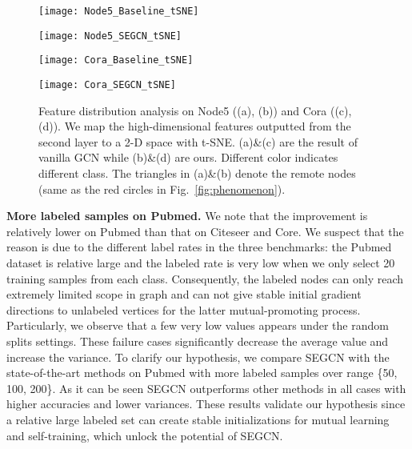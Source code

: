 \documentclass[letterpaper]{article} \usepackage{aaai19}  \usepackage{times}  \usepackage{helvet}  \usepackage{courier}  \usepackage{url}  \usepackage{graphicx}  \usepackage{algorithm}
\begin{document}
\begin{figure*} 

\begin{minipage}[b]{.24\textwidth}
\texttt{[image: Node5\_Baseline\_tSNE]}
\subcaption{}
\end{minipage}
\begin{minipage}[b]{.24\linewidth}
\texttt{[image: Node5\_SEGCN\_tSNE]}
\subcaption{}
\end{minipage}
\begin{minipage}[b]{.24\linewidth}
\texttt{[image: Cora\_Baseline\_tSNE]}
\subcaption{}
\end{minipage}
\begin{minipage}[b]{.24\linewidth}
\texttt{[image: Cora\_SEGCN\_tSNE]}
\subcaption{}
\end{minipage}
\caption{Feature distribution analysis on Node5 ((a), (b)) and Cora ((c), (d)). We map the high-dimensional features outputted from the second layer to a 2-D space with t-SNE. (a)\&(c) are the result of vanilla GCN while (b)\&(d) are ours. Different color indicates different class. The triangles in (a)\&(b) denote the remote nodes (same as the red circles in Fig.~\ref{fig:phenomenon}).}
\label{fig:tSNE}
\end{figure*} 
\textbf{More labeled samples on Pubmed.} We note that the improvement is relatively lower on Pubmed than that on Citeseer and Core. We suspect that the reason is due to the different label rates in the three benchmarks: the Pubmed dataset is relative large and the labeled rate is very low when we only select 20 training samples from each class. Consequently, the labeled nodes can only reach extremely limited scope in graph and can not give stable initial gradient directions to unlabeled vertices for the latter mutual-promoting process. Particularly, we observe that a few very low values appears under the random splits settings. These failure cases significantly decrease the average value and increase the variance. To clarify our hypothesis, we compare SEGCN with the state-of-the-art methods on Pubmed with more labeled samples over range \{50, 100, 200\}. As it can be seen SEGCN outperforms other methods in all cases with higher accuracies and lower variances. These results validate our hypothesis since a relative large labeled set can create stable initializations for mutual learning and self-training, which unlock the potential of SEGCN.
\end{document}
